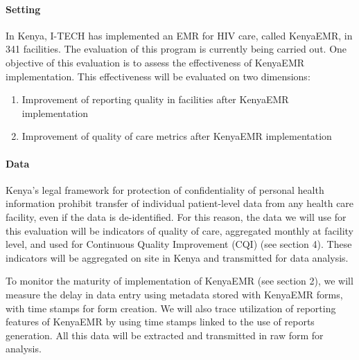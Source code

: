 \documentclass[a4paper,11pt,final,twoside]{article}
\begin{document}
\paragraph{Setting} In Kenya, I-TECH has implemented an EMR for HIV care, called KenyaEMR, in 341 facilities. The evaluation of this program is currently being carried out. One objective of this evaluation is to assess the effectiveness of KenyaEMR implementation. This effectiveness will be evaluated on two dimensions:
\begin{enumerate}
\item	Improvement of reporting quality in facilities after KenyaEMR implementation
\item	Improvement of quality of care metrics after KenyaEMR implementation
\end{enumerate}

\paragraph{Data} Kenya’s legal framework for protection of confidentiality of personal health information prohibit transfer of individual patient-level data from any health care facility, even if the data is de-identified. For this reason, the data we will use for this evaluation will be indicators of quality of care, aggregated monthly at facility level, and used for Continuous Quality Improvement (CQI) (see section 4). These indicators will be aggregated on site in Kenya and transmitted for data analysis.

To monitor the maturity of implementation of KenyaEMR (see section 2), we will measure the delay in data entry using metadata stored with KenyaEMR forms, with time stamps for form creation. We will also trace utilization of reporting features of KenyaEMR by using time stamps linked to the use of reports generation. All this data will be extracted and transmitted in raw form for analysis.
\end{document}

